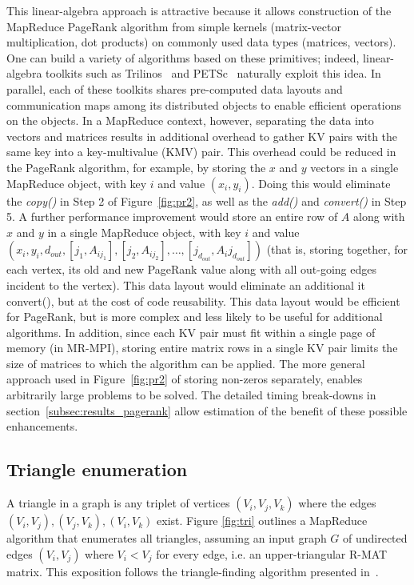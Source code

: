 This linear-algebra approach is attractive because it allows
construction of the MapReduce PageRank algorithm from simple kernels
(matrix-vector multiplication, dot products) on commonly used data
types (matrices, vectors).  One can build a variety of algorithms
based on these primitives; indeed, linear-algebra toolkits such as
Trilinos~\cite{Trilinos-Overview} and PETSc~\cite{petsc-efficient}
naturally exploit this idea.  In parallel, each of these toolkits shares
pre-computed data layouts and communication maps among its distributed
objects to enable efficient operations on the objects.  In a MapReduce
context, however, separating the data into vectors and matrices
results in additional overhead to gather KV pairs with the same key
into a key-multivalue (KMV) pair.  This overhead could be reduced in
the PageRank algorithm, for example, by storing the $x$ and $y$
vectors in a single MapReduce object, with key $i$ and value $(x_i,
y_i)$.  Doing this would eliminate the {\it copy()} in Step 2 of
Figure~\ref{fig:pr2}, as well as the {\it add()} and {\it convert()}
in Step 5.  A further performance improvement would store an entire
row of $A$ along with $x$ and $y$ in a single MapReduce object, with
key $i$ and value $(x_i, y_i, d_{out}, [j_1, A_{ij_1}], [j_2,
A_{ij_2}], \dots, [j_{d_{out}}, A_ij_{d_{out}}])$ (that is, storing
together, for each vertex, its old and new PageRank value along with
all out-going edges incident to the vertex).  This data layout would
eliminate an additional {it convert()}, but at the cost of code
reusability.  This data layout would be efficient for PageRank, but is
more complex and less likely to be useful for additional algorithms.
In addition, since each KV pair must fit within a single page of
memory (in MR-MPI), storing entire matrix rows in a single KV pair
limits the size of matrices to which the algorithm can be applied.
The more general approach used in Figure~\ref{fig:pr2} of storing
non-zeros separately, enables arbitrarily large problems to be solved.
The detailed timing break-downs in
section~\ref{subsec:results_pagerank} allow estimation of the benefit
of these possible enhancements.

\subsection{Triangle enumeration}

A triangle in a graph is any triplet of vertices $(V_i,V_j,V_k)$ where
the edges $(V_i,V_j), (V_j,V_k), (V_i,V_k)$ exist.  Figure
\ref{fig:tri} outlines a MapReduce algorithm that enumerates all
triangles, assuming an input graph $G$ of undirected edges $(V_i,V_j)$
where $V_i < V_j$ for every edge, i.e. an upper-triangular R-MAT
matrix.  This exposition follows the triangle-finding algorithm
presented in~\cite{Cohen09}.

